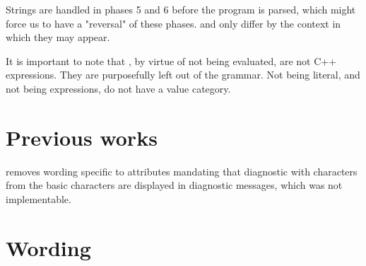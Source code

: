 \documentclass{wg21}
\begin{document}
Strings are handled in phases 5 and 6 before the program is parsed,
which might force us to have a "reversal" of these phases.
 and  only differ by the context in which they may appear.

It is important to note that , by virtue of not being evaluated, are not C++ expressions.
They are purposefully left out of the  grammar.
Not being literal, and not being expressions,  do not have a value category.

\section{Previous works}

 removes wording specific to attributes mandating that diagnostic with characters
from the basic characters are displayed in diagnostic messages, which was not implementable.

\section{Wording}


%
\end{document}
